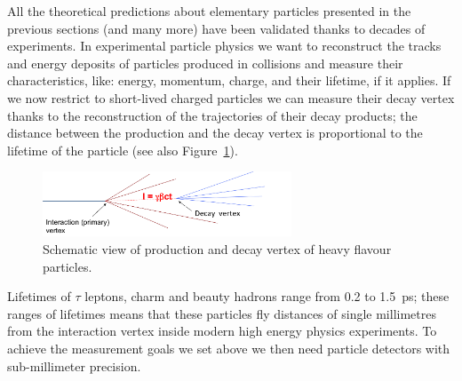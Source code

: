 All the theoretical predictions about elementary particles presented in the previous sections 
(and many more) 
have been validated thanks to decades of experiments. In experimental particle physics we 
want to 
reconstruct the tracks and energy deposits of particles produced in collisions and measure their 
characteristics, like: energy, momentum, charge, and their lifetime, if it applies.
If we now restrict to short-lived charged particles 
we can measure their   decay vertex thanks to 
the reconstruction of the trajectories of their decay products; the distance between the production and  the decay vertex is proportional to the 
lifetime of the particle (see also Figure~\ref{fig:HFDV}).

\begin{figure}[htbp]
   \centering
   \includegraphics[width=0.66\textwidth]{lifetime.png} %
   \caption{Schematic view of production and decay vertex of heavy flavour particles.}
   \label{fig:HFDV}
\end{figure}

Lifetimes of $\tau$ leptons, charm 
and beauty hadrons range from 0.2 to 1.5~ps; these ranges of lifetimes means that these particles 
fly distances of single millimetres from the interaction vertex inside modern high energy physics 
experiments. To achieve the measurement goals we set above we then need particle detectors
with sub-millimeter precision.

